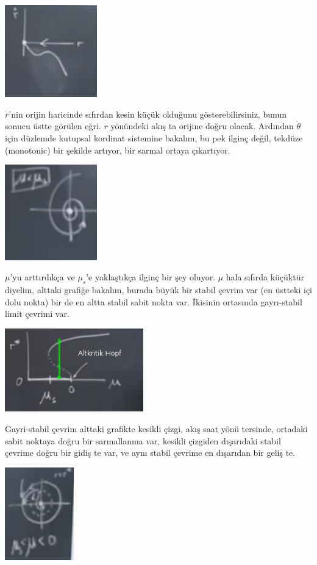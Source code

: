 \documentclass[12pt,fleqn]{article}\usepackage{../../common}
\begin{document}
\includegraphics[width=4cm]{14_02.png}

$\dot{r}$'nin orijin haricinde sıfırdan kesin küçük olduğunu
gösterebilirsiniz, bunun sonucu üstte görülen eğri. $r$ yönündeki akış ta
orijine doğru olacak. Ardından $\dot{\theta}$ için düzlemde kutupsal
kordinat sistemine bakalım, bu pek ilginç değil, tekdüze (monotonic) bir
şekilde artıyor, bir sarmal ortaya çıkartıyor.

\includegraphics[width=4cm]{14_04.png}

$\mu$'yu arttırdıkça ve $\mu_s$'e yaklaştıkça ilginç bir şey oluyor. $\mu$
hala sıfırda küçüktür diyelim, alttaki grafiğe bakalım, burada büyük bir
stabil çevrim var (en üstteki içi dolu nokta) bir de en altta stabil sabit
nokta var. İkisinin ortasında gayrı-stabil limit çevrimi var. 

\includegraphics[width=6cm]{14_05.png}

Gayri-stabil çevrim alttaki grafikte kesikli çizgi, akış saat yönü
tersinde, ortadaki sabit noktaya doğru bir sarmallanma var, kesikli
çizgiden dışarıdaki stabil çevrime doğru bir gidiş te var, ve aynı stabil
çevrime en dışarıdan bir geliş te. 

\includegraphics[width=3cm]{14_03.png}
\end{document}
